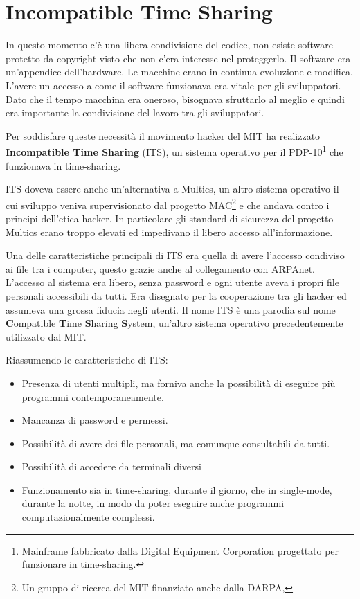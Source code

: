 \section{Incompatible Time Sharing}

In questo momento c'è una libera condivisione del codice, non esiste software protetto da copyright visto che non c'era interesse nel proteggerlo. 
Il software era un'appendice dell'hardware. Le macchine erano in continua evoluzione e modifica. 
L'avere un accesso a come il software funzionava era vitale per gli sviluppatori. 
Dato che il tempo macchina era oneroso, bisognava sfruttarlo al meglio e quindi era importante la condivisione del lavoro tra gli sviluppatori.

Per soddisfare queste necessità il movimento hacker del MIT ha realizzato \textbf{Incompatible Time Sharing} (ITS), un sistema operativo per il PDP-10\footnote{Mainframe fabbricato dalla Digital Equipment Corporation progettato per funzionare in time-sharing.} che funzionava in time-sharing.

ITS doveva essere anche un'alternativa a Multics, un altro sistema operativo il cui sviluppo veniva supervisionato dal progetto MAC\footnote{Un gruppo di ricerca del MIT finanziato anche dalla DARPA,} e che andava contro i principi dell'etica hacker. In particolare gli standard di sicurezza del progetto Multics erano troppo elevati ed impedivano il libero accesso all'informazione.

Una delle caratteristiche principali di ITS era quella di avere l'accesso condiviso ai file tra i computer, questo grazie anche al collegamento con ARPAnet. 
L'accesso al sistema era libero, senza password e ogni utente aveva i propri file personali accessibili da tutti. 
Era disegnato per la cooperazione tra gli hacker ed assumeva una grossa fiducia negli utenti.
Il nome ITS è una parodia sul nome \textbf{C}ompatible \textbf{T}ime \textbf{S}haring \textbf{S}ystem, un'altro sistema operativo precedentemente utilizzato dal MIT.

Riassumendo le caratteristiche di ITS:

\begin{itemize}
	\item Presenza di utenti multipli, ma forniva anche la possibilità di eseguire più programmi contemporaneamente.
	\item Mancanza di password e permessi.
	\item Possibilità di avere dei file personali, ma comunque consultabili da tutti.
	\item Possibilità di accedere da terminali diversi
	\item Funzionamento sia in time-sharing, durante il giorno, che in single-mode, durante la notte, in modo da poter eseguire anche programmi computazionalmente complessi.
\end{itemize}

